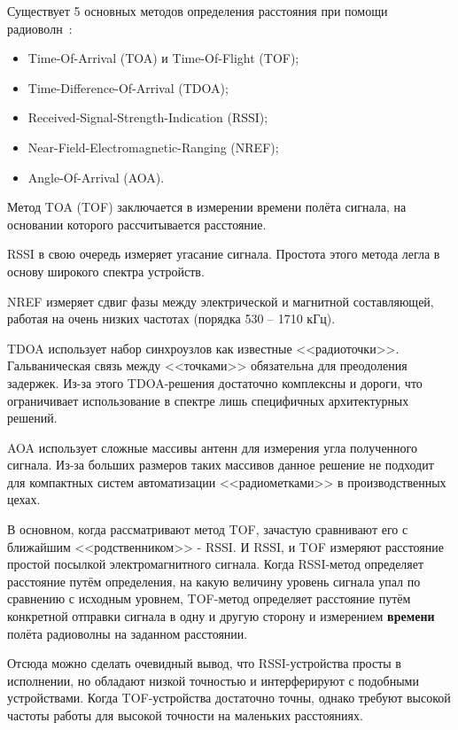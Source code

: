 Существует 5 основных методов определения расстояния при помощи радиоволн~\cite{radiofreq:tof}:

\begin{itemize}
    \item Time-Of-Arrival (TOA) и Time-Of-Flight (TOF);
    \item Time-Difference-Of-Arrival (TDOA);
    \item Received-Signal-Strength-Indication (RSSI);
    \item Near-Field-Electromagnetic-Ranging (NREF);
    \item Angle-Of-Arrival (AOA).
\end{itemize}

Метод TOA (TOF) заключается в измерении времени полёта сигнала, на основании которого рассчитывается расстояние.

RSSI в свою очередь измеряет угасание сигнала. Простота этого метода легла в основу широкого спектра устройств.

NREF измеряет сдвиг фазы между электрической и магнитной составляющей, работая на очень низких частотах (порядка 530 -- 1710 кГц).

TDOA использует набор синхроузлов как известные <<радиоточки>>. Гальваническая связь между <<точками>> обязательна для преодоления задержек. Из-за этого TDOA-решения достаточно комплексны и дороги, что ограничивает использование в спектре лишь специфичных архитектурных решений.

AOA использует сложные массивы антенн для измерения угла полученного сигнала. Из-за больших размеров таких массивов данное решение не подходит для компактных систем автоматизации <<радиометками>> в производственных цехах.

В основном, когда рассматривают метод TOF, зачастую сравнивают его с ближайшим <<родственником>> - RSSI. И RSSI, и TOF измеряют расстояние простой посылкой электромагнитного сигнала. Когда RSSI-метод определяет расстояние путём определения, на какую величину уровень сигнала упал по сравнению с исходным уровнем, TOF-метод определяет расстояние путём конкретной отправки сигнала в одну и другую сторону и измерением \textbf{времени} полёта радиоволны на заданном расстоянии.

Отсюда можно сделать очевидный вывод, что RSSI-устройства просты в исполнении, но обладают низкой точностью и интерферируют с подобными устройствами. Когда TOF-устройства достаточно точны, однако требуют высокой частоты работы для высокой точности на маленьких расстояниях.
